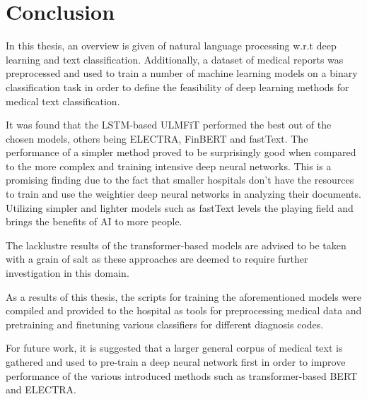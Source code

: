 \chapter{Conclusion} \label{Conclusion}
In this thesis, an overview is given of natural language processing w.r.t deep learning and text classification.
Additionally, a dataset of medical reports was preprocessed and used to train a number of machine learning models on a binary classification task in order to define the feasibility of deep learning methods for medical text classification.

It was found that the LSTM-based ULMFiT performed the best out of the chosen models, others being ELECTRA, FinBERT and fastText.
The performance of a simpler method proved to be surprisingly good when compared to the more complex and training intensive deep neural networks.
This is a promising finding due to the fact that smaller hospitals don't have the resources to train and use the weightier deep neural networks in analyzing their documents.
Utilizing simpler and lighter models such as fastText levels the playing field and brings the benefits of AI to more people.

The lacklustre results of the transformer-based models are advised to be taken with a grain of salt as these approaches are deemed to require further investigation in this domain.

As a results of this thesis, the scripts for training the aforementioned models were compiled and provided to the hospital as tools for preprocessing medical data and pretraining and finetuning various classifiers for different diagnosis codes.

For future work, it is suggested that a larger general corpus of medical text is gathered and used to pre-train a deep neural network first in order to improve performance of the various introduced methods such as transformer-based BERT and ELECTRA.
